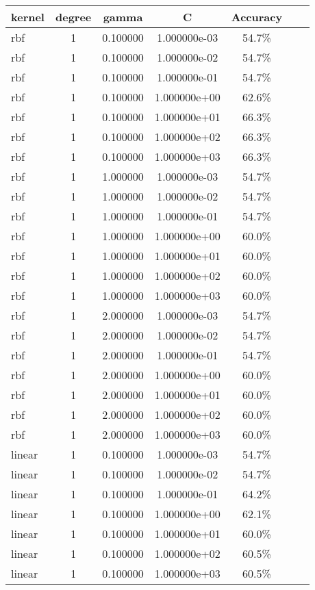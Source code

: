 \documentclass[11pt,spanish,listoffigures,listoftables]{tfgetsinf}
\begin{document}
 \begin{table}
 \begin{tabular}{l*{5}{c}r}
 kernel & degree & gamma & C & Accuracy\\
 \hline
 rbf & 1 & 0.100000 & 1.000000e-03 & 54.7\%\\
 rbf & 1 & 0.100000 & 1.000000e-02 & 54.7\%\\
 rbf & 1 & 0.100000 & 1.000000e-01 & 54.7\%\\
 rbf & 1 & 0.100000 & 1.000000e+00 & 62.6\%\\
 rbf & 1 & 0.100000 & 1.000000e+01 & 66.3\%\\
 rbf & 1 & 0.100000 & 1.000000e+02 & 66.3\%\\
 rbf & 1 & 0.100000 & 1.000000e+03 & 66.3\%\\
 rbf & 1 & 1.000000 & 1.000000e-03 & 54.7\%\\
 rbf & 1 & 1.000000 & 1.000000e-02 & 54.7\%\\
 rbf & 1 & 1.000000 & 1.000000e-01 & 54.7\%\\
 rbf & 1 & 1.000000 & 1.000000e+00 & 60.0\%\\
 rbf & 1 & 1.000000 & 1.000000e+01 & 60.0\%\\
 rbf & 1 & 1.000000 & 1.000000e+02 & 60.0\%\\
 rbf & 1 & 1.000000 & 1.000000e+03 & 60.0\%\\
 rbf & 1 & 2.000000 & 1.000000e-03 & 54.7\%\\
 rbf & 1 & 2.000000 & 1.000000e-02 & 54.7\%\\
 rbf & 1 & 2.000000 & 1.000000e-01 & 54.7\%\\
 rbf & 1 & 2.000000 & 1.000000e+00 & 60.0\%\\
 rbf & 1 & 2.000000 & 1.000000e+01 & 60.0\%\\
 rbf & 1 & 2.000000 & 1.000000e+02 & 60.0\%\\
 rbf & 1 & 2.000000 & 1.000000e+03 & 60.0\%\\
 linear & 1 & 0.100000 & 1.000000e-03 & 54.7\%\\
 linear & 1 & 0.100000 & 1.000000e-02 & 54.7\%\\
 linear & 1 & 0.100000 & 1.000000e-01 & 64.2\%\\
 linear & 1 & 0.100000 & 1.000000e+00 & 62.1\%\\
 linear & 1 & 0.100000 & 1.000000e+01 & 60.0\%\\
 linear & 1 & 0.100000 & 1.000000e+02 & 60.5\%\\
 linear & 1 & 0.100000 & 1.000000e+03 & 60.5\%\\

\end{tabular}
\end{table}
\end{document}
